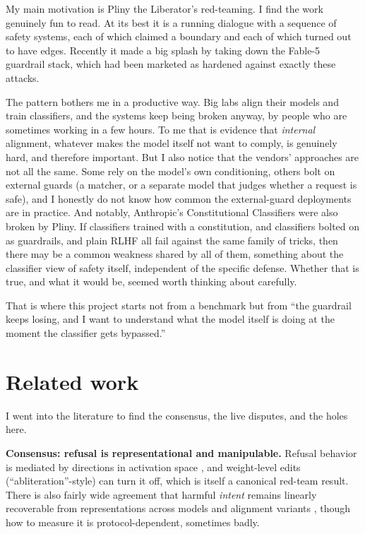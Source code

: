 \documentclass{article}
\begin{document}
My main motivation is Pliny the Liberator's red-teaming. I find the work genuinely fun to read. At
its best it is a running dialogue with a sequence of safety systems, each of which claimed a boundary
and each of which turned out to have edges. Recently it made a big splash by taking down the
Fable-5 guardrail stack, which had been marketed as hardened against exactly these attacks.

The pattern bothers me in a productive way. Big labs align their models and train classifiers, and
the systems keep being broken anyway, by people who are sometimes working in a few hours. To me that
is evidence that \emph{internal} alignment, whatever makes the model itself not want to comply, is
genuinely hard, and therefore important. But I also notice that the vendors' approaches are not all
the same. Some rely on the model's own conditioning, others bolt on external guards (a matcher, or a
separate model that judges whether a request is safe), and I honestly do not know how common the
external-guard deployments are in practice. And notably, Anthropic's Constitutional Classifiers were
also broken by Pliny. If classifiers trained with a constitution, and classifiers bolted on as
guardrails, and plain RLHF all fail against the same family of tricks, then there may be a common
weakness shared by all of them, something about the classifier view of safety itself, independent of
the specific defense. Whether that is true, and what it would be, seemed worth thinking about
carefully.

That is where this project starts not from a benchmark but from ``the guardrail keeps losing, and
I want to understand what the model itself is doing at the moment the classifier gets bypassed.''

\section{Related work}\label{sec:related}

I went into the literature to find the consensus, the live disputes, and the holes here.

\textbf{Consensus: refusal is representational and manipulable.} Refusal behavior is mediated by
directions in activation space \cite{Arditi2024,He2024}, and weight-level edits
(``abliteration''-style) can turn it off, which is itself a canonical red-team result. There is also
fairly wide agreement that harmful \emph{intent} remains linearly recoverable from representations
across models and alignment variants \cite{harmfulIntent2026}, though how to measure it is
protocol-dependent, sometimes badly.
\end{document}
